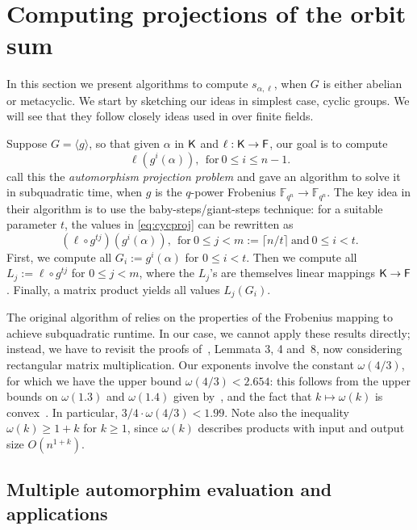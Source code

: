 \section{Computing projections of the orbit sum}
\label{sec:osum}

In this section we present algorithms to compute $s_{\alpha,\ell}$,
when $G$ is either abelian or metacyclic. We start by sketching our
ideas in simplest case, cyclic groups.  We will see that they follow
closely ideas used in \cite{KalSho98} over finite fields.

Suppose $G = \langle g \rangle$, so that given $\alpha$ in ${\mathsf{K}}$ and
$\ell: {\mathsf{K}} \to {\mathsf{F}}$, our goal is to compute
\begin{equation}
  \label{eq:cycproj}
  \ell(g^i(\alpha)), ~~\mbox{for}~ 0\leq i\leq n-1.
\end{equation}
 call this the \emph{automorphism projection problem} and
gave an algorithm to solve it in subquadratic time, when $g$ is the
$q$-power Frobenius $\mathbb{F}_{q^n} \to \mathbb{F}_{q^n}$.  The key idea in their
algorithm is to use the baby-steps/giant-steps technique: for a suitable
parameter $t$, the values in \eqref{eq:cycproj} can be rewritten as
\[
  (\ell \circ g^{tj})(g^i(\alpha)), ~~\mbox{for}~ 0 \leq j < m:=\lceil n/t
  \rceil ~\mbox{and}~ 0 \leq i <t.
\]
First, we compute all $G_i:=g^i(\alpha)$ for $0 \leq i <t$.  Then we compute
all $L_j:=\ell \circ g^{tj}$ for $0 \leq j <m$, where the $L_j$'s are
themselves linear mappings ${\mathsf{K}} \to {\mathsf{F}}$.  Finally, a matrix product yields
all values $L_j(G_i)$.

The original algorithm of  relies on the properties of the
Frobenius mapping to achieve subquadratic runtime. In our case, we cannot
apply these results directly; instead, we have to revisit the proofs
of~, Lemmata 3, 4 and~8, now considering rectangular matrix
multiplication.  Our exponents involve the constant $\omega(4/3)$, for
which we have the upper bound $\omega(4/3) < 2.654$: this follows from the
upper bounds on $\omega(1.3)$ and $\omega(1.4)$ given by~, and
the fact that $k \mapsto \omega(k)$ is convex~\cite{LoRo83}. In particular,
$3/4 \cdot \omega(4/3) < 1.99$. Note also the inequality
$\omega(k) \ge 1+k$ for $k\ge 1$, since $\omega(k)$ describes products with
input and output size $O(n^{1+k})$.


\subsection{Multiple automorphim evaluation and applications}


